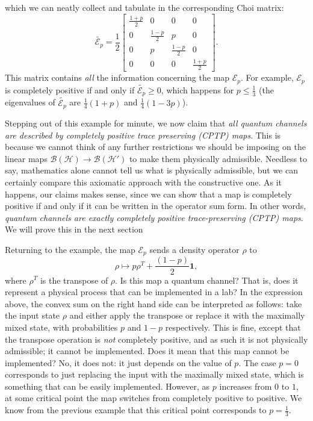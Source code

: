 \documentclass[fleqn]{article}
\begin{document}
which we can neatly collect and tabulate in the corresponding Choi matrix:
\[
  \widetilde{\mathcal{E}_p}
  = \frac{1}{2}
  \left[
    \begin{array}{cc|cc}
      \frac{1+p}{2} & 0 & 0 & 0
    \\0 & \frac{1-p}{2} & p & 0
    \\\hline
      0 & p & \frac{1-p}{2} & 0
    \\0 & 0 & 0 & \frac{1+p}{2}
    \end{array}
  \right].
\]
This matrix contains \emph{all} the information concerning the map \(\mathcal{E}_p\).
For example, \(\mathcal{E}_p\) is completely positive if and only if \(\widetilde{\mathcal{E}_p}\geqslant 0\), which happens for \(p\leqslant\frac{1}{3}\) (the eigenvalues of \(\widetilde{\mathcal{E}_p}\) are \(\frac{1}{4}(1+p)\) and \(\frac{1}{4}(1-3p)\)).

Stepping out of this example for minute, we now claim that \emph{all quantum channels are described by completely positive trace preserving (CPTP) maps}. This is because we cannot think of any further restrictions we should be imposing on the linear maps \(\mathscr{B}(\mathcal{H})\to\mathscr{B}(\mathcal{H'})\) to make them physically admissible.
Needless to say, mathematics alone cannot tell us what is physically admissible, but we can certainly compare this axiomatic approach with the constructive one.
As it happens, our claims makes sense, since we can show that a map is completely positive if and only if it can be written in the operator sum form.
In other words, \emph{quantum channels are exactly completely positive trace-preserving (CPTP) maps}.
We will prove this in the next section

Returning to the example, the map \(\mathcal{E}_p\) sends a density operator \(\rho\) to
\[
  \rho \longmapsto p\rho^T + \frac{(1-p)}{2}\mathbf{1},
\]
where \(\rho^T\) is the transpose of \(\rho\).
Is this map a quantum channel?
That is, does it represent a physical process that can be implemented in a lab?
In the expression above, the convex sum on the right hand side can be interpreted as follows: take the input state \(\rho\) and either apply the transpose or replace it with the maximally mixed state, with probabilities \(p\) and \(1-p\) respectively.
This is fine, except that the transpose operation is \emph{not} completely positive, and as such it is not physically admissible; it cannot be implemented.
Does it mean that this map cannot be implemented?
No, it does not: it just depends on the value of \(p\).
The case \(p=0\) corresponds to just replacing the input with the maximally mixed state, which is something that can be easily implemented.
However, as \(p\) increases from \(0\) to \(1\), at some critical point the map switches from completely positive to positive. We know from the previous example that this critical point corresponds to \(p=\frac{1}{3}\).
\end{document}
